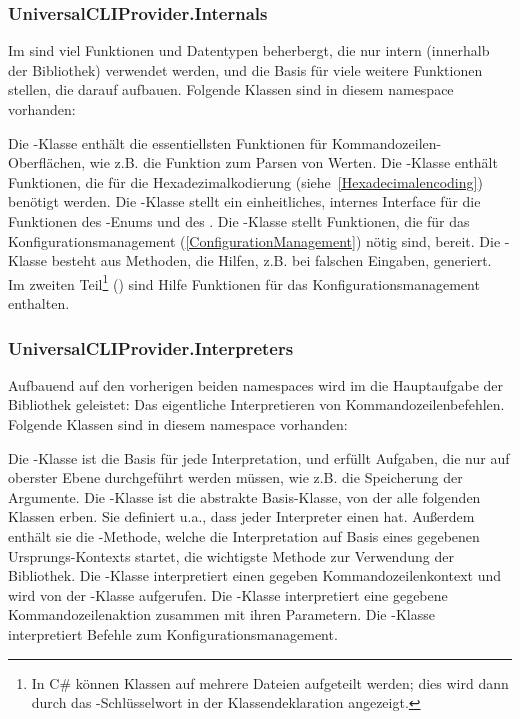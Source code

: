 \subsubsection{UniversalCLIProvider.Internals}
Im  sind viel Funktionen und Datentypen beherbergt, die nur intern (innerhalb der Bibliothek) verwendet werden,
und die Basis für viele weitere Funktionen stellen, die darauf aufbauen.
Folgende Klassen sind in diesem namespace vorhanden:
\begin{outline}
 \1 Die -Klasse enthält die essentiellsten Funktionen für Kommandozeilen-Oberflächen, wie z.B. die Funktion zum Parsen von Werten.
 \1 Die -Klasse enthält Funktionen, die für die Hexadezimalkodierung (siehe~\ref{Hexadecimalencoding}) benötigt werden.
 \1 Die -Klasse stellt ein einheitliches, internes Interface für die Funktionen des -Enums und des .
 \1 Die -Klasse stellt Funktionen, die für das Konfigurationsmanagement (\ref{ConfigurationManagement}) nötig sind, bereit.
 \1 Die -Klasse besteht aus Methoden, die Hilfen, z.B. bei falschen Eingaben, generiert.
 Im zweiten Teil\footnote{In C\# können Klassen auf mehrere Dateien aufgeteilt werden; dies wird dann durch das -Schlüsselwort in der Klassendeklaration angezeigt.}
 () sind Hilfe Funktionen für das Konfigurationsmanagement enthalten.
\end{outline}
\subsubsection{UniversalCLIProvider.Interpreters}
Aufbauend auf den vorherigen beiden namespaces wird im  die Hauptaufgabe der Bibliothek geleistet:
Das eigentliche Interpretieren von Kommandozeilenbefehlen.
Folgende Klassen sind in diesem namespace vorhanden:
\begin{outline}
 \1 Die -Klasse ist die Basis für jede Interpretation, und erfüllt Aufgaben, die nur auf oberster Ebene durchgeführt werden müssen, wie z.B. die Speicherung der Argumente.
 \1 Die -Klasse ist die abstrakte Basis-Klasse, von der alle folgenden Klassen erben.
 Sie definiert u.a., dass jeder Interpreter einen  hat.
 Au\ss erdem enthält sie die -Methode, welche die Interpretation auf Basis eines gegebenen Ursprungs-Kontexts startet, die wichtigste Methode zur Verwendung der Bibliothek.
 \1 Die -Klasse interpretiert einen gegeben Kommandozeilenkontext und wird von der -Klasse aufgerufen.
 \1 Die -Klasse interpretiert eine gegebene Kommandozeilenaktion zusammen mit ihren Parametern.
 \1 Die -Klasse interpretiert Befehle zum Konfigurationsmanagement.
\end{outline}
